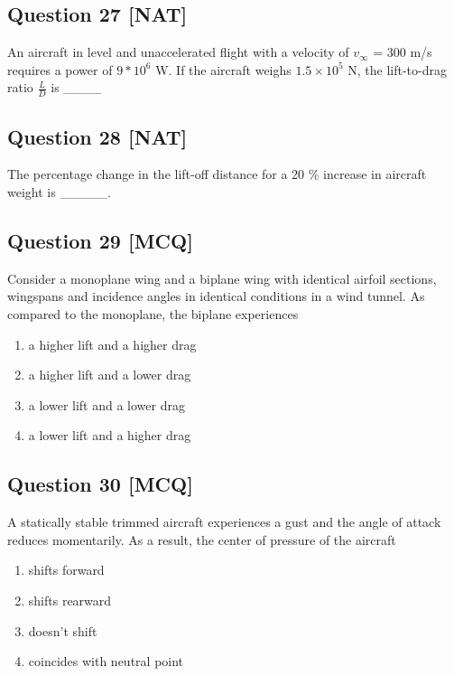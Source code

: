 \documentclass[12pt,a4paper]{article}
\begin{document}
	



\subsection*{Question 27 [NAT]}
An aircraft in level and unaccelerated flight with a velocity of $v_{\infty}$ = 300 m/s  requires a power of $9*10^{6}$ W. If the aircraft weighs $1.5×10^{5}$ N, the lift-to-drag ratio $\frac{L}{D}$ is \_\_\_\_



\subsection*{Question 28 [NAT]}
The percentage change in the lift-off distance for a 20 \% increase in aircraft weight is \_\_\_\_\_. 



\subsection*{Question 29 [MCQ]}
Consider a monoplane wing and a biplane wing with identical airfoil sections, wingspans and incidence angles in identical conditions in a wind tunnel.  As compared to the monoplane, the biplane experiences
\begin{enumerate}[label=(\alph*)]
\item  a higher lift and a higher drag
\item  a higher lift and a lower drag
\item a lower lift and a lower drag
\item  a lower lift and a higher drag
\end{enumerate}


\subsection*{Question 30 [MCQ]}
A statically stable trimmed aircraft experiences a gust and the angle of attack reduces momentarily. As a result, the center of pressure of the aircraft 
\begin{enumerate}[label=(\alph*)]
\item shifts forward 
\item  shifts rearward
\item doesn't shift
\item  coincides with neutral point
\end{enumerate}
\end{document}
